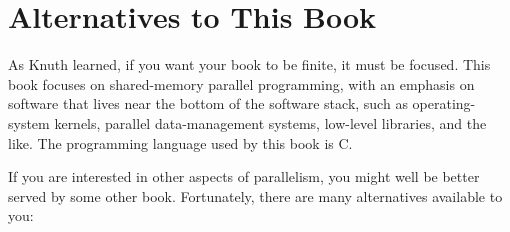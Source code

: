 \section{Alternatives to This Book}
\label{sec:Alternatives to This Book}

As Knuth learned, if you want your book to be finite, it must be focused.
This book focuses on shared-memory parallel programming, with an
emphasis on software that lives near the bottom of the software stack,
such as operating-system kernels, parallel data-management systems,
low-level libraries, and the like.
The programming language used by this book is C.

If you are interested in other aspects of parallelism, you might well
be better served by some other book.
Fortunately, there are many alternatives available to you:

